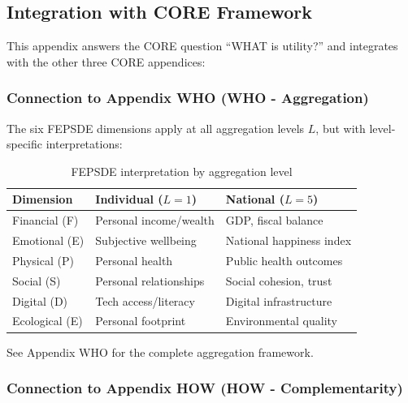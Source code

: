 


\subsection{Integration with CORE Framework}
\label{sec:C-core-integration}

This appendix answers the CORE question ``WHAT is utility?'' and integrates 
with the other three CORE appendices:

\subsubsection{Connection to Appendix WHO (WHO - Aggregation)}

The six FEPSDE dimensions apply at all aggregation levels $L$, but with 
level-specific interpretations:

\begin{table}[h]
\centering
\small
\begin{tabular}{l|ll}
\toprule
\textbf{Dimension} & \textbf{Individual ($L=1$)} & \textbf{National ($L=5$)} \\
\midrule
Financial (F) & Personal income/wealth & GDP, fiscal balance \\
Emotional (E) & Subjective wellbeing & National happiness index \\
Physical (P) & Personal health & Public health outcomes \\
Social (S) & Personal relationships & Social cohesion, trust \\
Digital (D) & Tech access/literacy & Digital infrastructure \\
Ecological (E) & Personal footprint & Environmental quality \\
\bottomrule
\end{tabular}
\caption{FEPSDE interpretation by aggregation level}
\end{table}

See Appendix WHO for the complete aggregation framework.

\subsubsection{Connection to Appendix HOW (HOW - Complementarity)}

